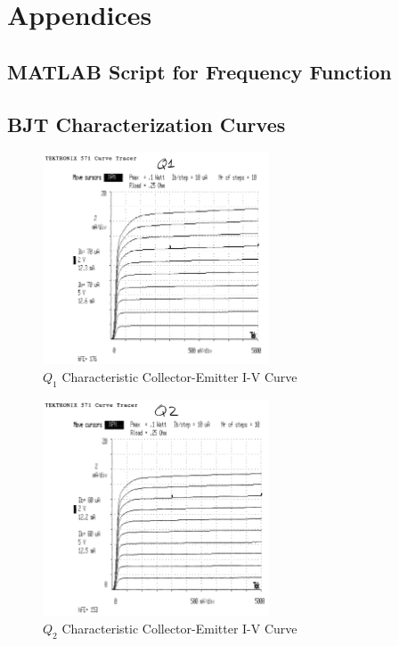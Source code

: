 \documentclass[titlepage, letterpaper, 10.5pt]{article}
\begin{document}
\section{Appendices}
\subsection{MATLAB Script for Frequency Function}
\label{matlab-plotting-script}


\clearpage
\subsection{BJT Characterization Curves}
\label{bjt-appendix}

\begin{figure}[ht]
	\centering
	\includegraphics[width=0.6\textwidth]{results/q1-characteristics}
	\caption{$Q_{1}$ Characteristic Collector-Emitter I-V Curve}
\end{figure}

\begin{figure}[ht]
	\centering
	\includegraphics[width=0.6\textwidth]{results/q2-characteristics}
	\caption{$Q_{2}$ Characteristic Collector-Emitter I-V Curve}
\end{figure}
\end{document}
